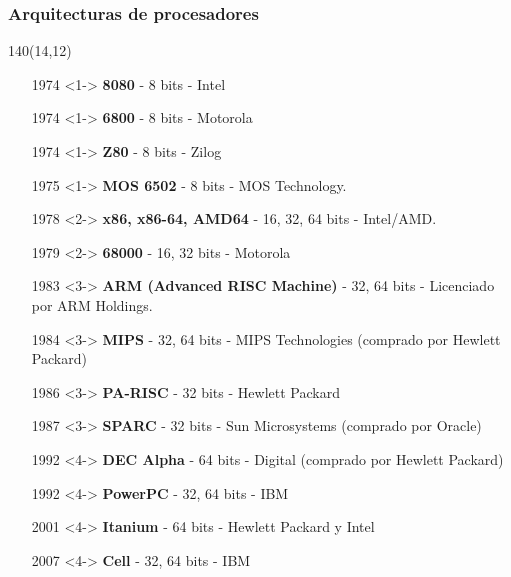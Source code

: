 \documentclass[aspectratio=169]{beamer}
\begin{document}
\begin{frame}[t,fragile]
    \frametitle{Arquitecturas de procesadores}
    \begin{textblock}{140}(14,12)
    \small
    \begin{itemize}
    \setlength\itemsep{0cm}
    \item[1974]<1-> \textbf{8080} - 8 bits - Intel
    \item[1974]<1-> \textbf{6800} - 8 bits - Motorola
    \item[1974]<1-> \textbf{Z80} - 8 bits - Zilog
    \item[1975]<1-> \textbf{MOS 6502} - 8 bits - MOS Technology.
    \item[1978]<2-> \textbf{x86, x86-64, AMD64} - 16, 32, 64 bits - Intel/AMD.
    \item[1979]<2-> \textbf{68000} - 16, 32 bits - Motorola
    \item[1983]<3-> \textbf{ARM (Advanced RISC Machine)} - 32, 64 bits - Licenciado por ARM Holdings.
    \item[1984]<3-> \textbf{MIPS} - 32, 64 bits - MIPS Technologies (comprado por Hewlett Packard)
    \item[1986]<3-> \textbf{PA-RISC} - 32 bits - Hewlett Packard
    \item[1987]<3-> \textbf{SPARC} - 32 bits - Sun Microsystems (comprado por Oracle)
    \item[1992]<4-> \textbf{DEC Alpha} - 64 bits - Digital (comprado por Hewlett Packard)
    \item[1992]<4-> \textbf{PowerPC} - 32, 64 bits - IBM
    \item[2001]<4-> \textbf{Itanium} - 64 bits - Hewlett Packard y Intel
    \item[2007]<4-> \textbf{Cell} - 32, 64 bits - IBM
    \end{itemize}
    \end{textblock}
\end{frame}
\end{document}
